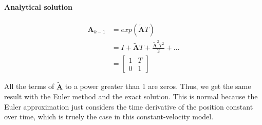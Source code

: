 \paragraph{Analytical solution}
\begin{align}
    \mathbf{A}_{k-1} & = exp(\mathbf{\tilde{A}}T) \\
    & = I + \mathbf{\tilde{A}}T + \frac{\mathbf{\tilde{A}}^2T^2}{2} + \dots \\
    & = \left[\begin{array}{cc}
        1 & T \\
        0 & 1
    \end{array}\right]
\end{align}

All the terms of $\mathbf{\tilde{A}}$ to a power greater than 1 are zeros. Thus, we get the same result with the Euler method and the exact solution. This is normal because the Euler approximation just considers the time derivative of the position constant over time, which is truely the case in this constant-velocity model.

